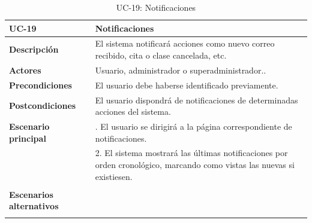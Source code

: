 \begin{table}[H]
  \begin{center}
    \begin{tabularx}{16.4cm}{|l|X|}
      \hline
      \textbf{UC-19} & \textbf{Notificaciones}\\
      \hline
      \textbf{Descripción} & El sistema notificará acciones como nuevo correo recibido, cita o clase cancelada, etc. \\
      \hline
      \textbf{Actores} & Usuario, administrador o superadministrador..\\
      \hline
      \textbf{Precondiciones} & El usuario debe haberse identificado previamente.\\
      \hline
      \textbf{Postcondiciones} & El usuario dispondrá de notificaciones de determinadas acciones del sistema. \\
      \hline
      \textbf{Escenario principal} & \smallskip 1. El usuario se dirigirá a la página correspondiente de notificaciones.\\
      & 2. El sistema mostrará las últimas notificaciones por orden cronológico, marcando como vistas las nuevas si existiesen.\\
      & \\
      \hline
      \textbf{Escenarios alternativos} & \\
      & \\
      \hline
    \end{tabularx}
    \caption{UC-19: Notificaciones}
    \label{tab:CU-notificaciones}
  \end{center}
\end{table}


